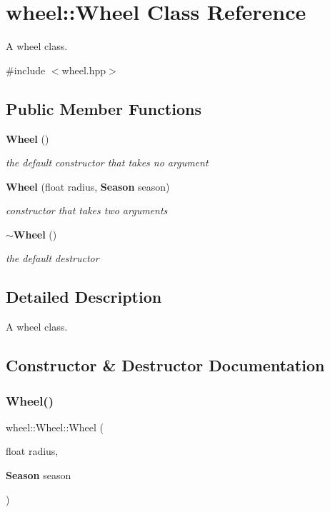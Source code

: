 \section{wheel\+:\+:Wheel Class Reference}
\label{classwheel_1_1_wheel}


A wheel class.  




{\ttfamily \#include $<$wheel.\+hpp$>$}

\subsection*{Public Member Functions}
\begin{DoxyCompactItemize}
\item 
\label{classwheel_1_1_wheel_a9590185c47006b35276f5d9b2972342d} 
{\bf Wheel} ()
\begin{DoxyCompactList}\small\item\em the default constructor that takes no argument \end{DoxyCompactList}\item 
{\bf Wheel} (float radius, {\bf Season} season)
\begin{DoxyCompactList}\small\item\em constructor that takes two arguments \end{DoxyCompactList}\item 
\label{classwheel_1_1_wheel_ab5674208ddac8e68187ed3da963e7346} 
{\bf $\sim$\+Wheel} ()
\begin{DoxyCompactList}\small\item\em the default destructor \end{DoxyCompactList}\end{DoxyCompactItemize}


\subsection{Detailed Description}
A wheel class. 

\subsection{Constructor \& Destructor Documentation}
\label{classwheel_1_1_wheel_a3e6815865706ffca1858be8c84bbbc34} 
\subsubsection{Wheel()}
{\footnotesize\ttfamily wheel\+::\+Wheel\+::\+Wheel (\begin{DoxyParamCaption}\item[{float}]{radius,  }\item[{{\bf Season}}]{season }\end{DoxyParamCaption})\hspace{0.3cm}{\ttfamily [inline]}}



